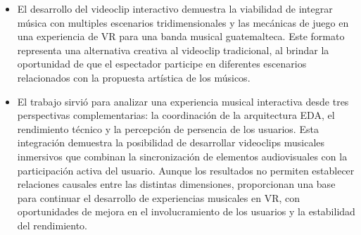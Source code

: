 \begin{itemize}
    \item El desarrollo del videoclip interactivo demuestra la viabilidad de integrar música con multiples escenarios tridimensionales y las mecánicas de juego en una experiencia de VR para
    una banda musical guatemalteca. Este formato representa una alternativa creativa al videoclip tradicional, al brindar la oportunidad de que el espectador participe en diferentes escenarios
    relacionados con la propuesta artística de los músicos.
    
    \item El trabajo sirvió para analizar una experiencia musical interactiva desde tres perspectivas complementarias:
    la coordinación de la arquitectura EDA, el rendimiento técnico y la percepción de persencia de los usuarios. 
    Esta integración demuestra la posibilidad de desarrollar videoclips musicales inmersivos que combinan la sincronización 
    de elementos audiovisuales con la participación activa del usuario. Aunque los resultados no permiten establecer relaciones
    causales entre las distintas dimensiones, proporcionan una base para continuar el desarrollo de experiencias musicales en VR, 
    con oportunidades de mejora en el involucramiento de los usuarios y la estabilidad del rendimiento. 


\end{itemize}